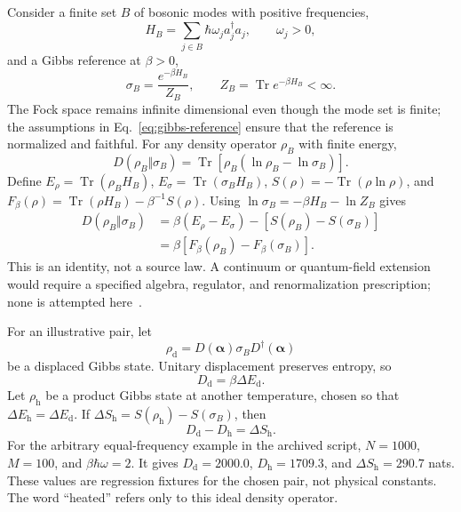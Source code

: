\documentclass[aps,prd,twocolumn,superscriptaddress,nofootinbib,floatfix]{revtex4-2}
\newcommand{\Tr}{\operatorname{Tr}}
\newcommand{\Drel}{D}
\begin{document}
Consider a finite set $B$ of bosonic modes with positive frequencies,
\begin{equation}
 H_B=\sum_{j\in B}\hbar\omega_j a_j^\dagger a_j,
 \qquad \omega_j>0,
 \label{eq:band-hamiltonian}
\end{equation}
and a Gibbs reference at $\beta>0$,
\begin{equation}
 \sigma_B=\frac{e^{-\beta H_B}}{Z_B},
 \qquad Z_B=\Tr e^{-\beta H_B}<\infty.
 \label{eq:gibbs-reference}
\end{equation}
The Fock space remains infinite dimensional even though the mode set is finite; the assumptions in Eq.~\eqref{eq:gibbs-reference} ensure that the reference is normalized and faithful. For any density operator $\rho_B$ with finite energy,
\begin{equation}
 \Drel(\rho_B\Vert\sigma_B)
 =\Tr\!\left[\rho_B(\ln\rho_B-\ln\sigma_B)\right].
 \label{eq:relative-entropy}
\end{equation}
Define $E_\rho=\Tr(\rho_BH_B)$, $E_\sigma=\Tr(\sigma_BH_B)$, $S(\rho)=-\Tr(\rho\ln\rho)$, and $F_\beta(\rho)=\Tr(\rho H_B)-\beta^{-1}S(\rho)$. Using $\ln\sigma_B=-\beta H_B-\ln Z_B$ gives
\begin{align}
 \Drel(\rho_B\Vert\sigma_B)
 &=\beta(E_\rho-E_\sigma)-[S(\rho_B)-S(\sigma_B)]\\
 &=\beta[F_\beta(\rho_B)-F_\beta(\sigma_B)].
 \label{eq:gibbs-identity}
\end{align}
This is an identity, not a source law. A continuum or quantum-field extension would require a specified algebra, regulator, and renormalization prescription; none is attempted here~\cite{Casini2008}.

For an illustrative pair, let
\begin{equation}
 \rho_{\mathrm d}=D(\bm\alpha)\sigma_BD^\dagger(\bm\alpha)
 \label{eq:displaced-state}
\end{equation}
be a displaced Gibbs state. Unitary displacement preserves entropy, so
\begin{equation}
 \Drel_{\mathrm d}=\beta\Delta E_{\mathrm d}.
 \label{eq:displaced-relative-entropy}
\end{equation}
Let $\rho_{\mathrm h}$ be a product Gibbs state at another temperature, chosen so that $\Delta E_{\mathrm h}=\Delta E_{\mathrm d}$. If $\Delta S_{\mathrm h}=S(\rho_{\mathrm h})-S(\sigma_B)$, then
\begin{equation}
 \Drel_{\mathrm d}-\Drel_{\mathrm h}=\Delta S_{\mathrm h}.
 \label{eq:entropy-contrast}
\end{equation}
For the arbitrary equal-frequency example in the archived script, $N=1000$, $M=100$, and $\beta\hbar\omega=2$. It gives $\Drel_{\mathrm d}=2000.0$, $\Drel_{\mathrm h}=1709.3$, and $\Delta S_{\mathrm h}=290.7$ nats. These values are regression fixtures for the chosen pair, not physical constants. The word ``heated'' refers only to this ideal density operator.
\end{document}
